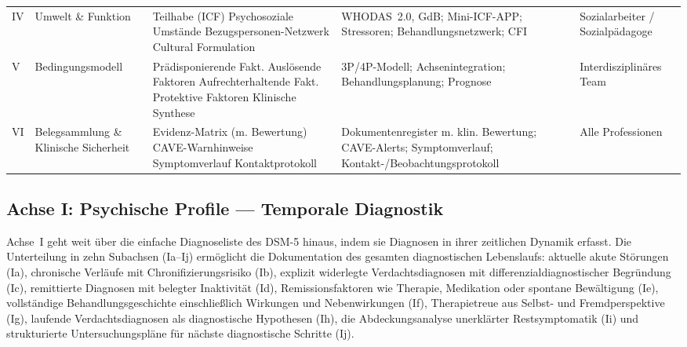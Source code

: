 \documentclass[11pt,a4paper]{article}
\begin{document}
\begin{longtable}{p{0.8cm}p{2.2cm}p{3.8cm}p{4cm}p{2cm}}
\addlinespace
IV & Umwelt \& Funktion & Teilhabe (ICF) \newline Psychosoziale Umst\"ande \newline Bezugspersonen-Netzwerk \newline Cultural Formulation & WHODAS~2.0, GdB; Mini-ICF-APP; Stressoren; Behandlungsnetzwerk; CFI & Sozialarbeiter / Sozialp\"adagoge \\
\addlinespace
V & Bedingungsmodell & Pr\"adisponierende Fakt. \newline Ausl\"osende Faktoren \newline Aufrechterhaltende Fakt. \newline Protektive Faktoren \newline Klinische Synthese & 3P/4P-Modell; Achsen\-integration; Behandlungs\-planung; Prognose & Interdisziplin\"ares Team \\
\addlinespace
VI & Belegsammlung \& Klinische Sicherheit & Evidenz-Matrix (m. Bewertung) \newline CAVE-Warnhinweise \newline Symptomverlauf \newline Kontaktprotokoll & Dokumentenregister m. klin. Bewertung; CAVE-Alerts; Symptomverlauf; Kontakt-/Beobachtungs\-protokoll & Alle Professionen \\
\bottomrule
\end{longtable}

\subsection{Achse I: Psychische Profile --- Temporale Diagnostik}
\label{sec:achse1}

Achse~I geht weit \"uber die einfache Diagnoseliste des DSM-5 hinaus, indem sie Diagnosen in ihrer zeitlichen Dynamik erfasst. Die Unterteilung in zehn Subachsen (Ia--Ij) erm\"oglicht die Dokumentation des gesamten diagnostischen Lebenslaufs: aktuelle akute St\"orungen (Ia), chronische Verl\"aufe mit Chronifizierungsrisiko (Ib), explizit widerlegte Verdachtsdiagnosen mit differenzialdiagnostischer Begr\"undung (Ic), remittierte Diagnosen mit belegter Inaktivit\"at (Id), Remissionsfaktoren wie Therapie, Medikation oder spontane Bew\"altigung (Ie), vollst\"andige Behandlungsgeschichte einschlie\ss{}lich Wirkungen und Nebenwirkungen (If), Therapietreue aus Selbst- und Fremdperspektive (Ig), laufende Verdachtsdiagnosen als diagnostische Hypothesen (Ih), die Abdeckungsanalyse unerkl\"arter Restsymptomatik (Ii) und strukturierte Untersuchungspl\"ane f\"ur n\"achste diagnostische Schritte (Ij).
\end{document}
